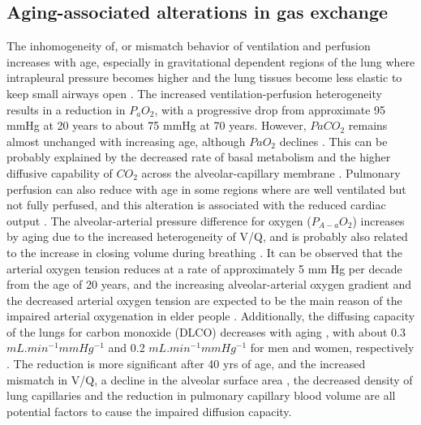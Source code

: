 \subsection{Aging-associated alterations in gas exchange}
The inhomogeneity of, or mismatch behavior of ventilation and perfusion increases with age, especially in gravitational dependent regions of the lung where intrapleural pressure becomes higher and the lung tissues become less elastic to keep small airways open \citep{holland1968regional, paoletti1985reference, lalley2013aging}. The increased ventilation-perfusion heterogeneity results in a reduction in $P_a O_2$, with a progressive drop from approximate 95 mmHg at 20 years to about 75 mmHg at 70 years. However, $Pa CO_2$ remains almost unchanged with increasing age, although $Pa O_2$ declines \citep{wahba1983influence, sprung2006age}. This can be probably explained by the decreased rate of basal metabolism and the higher diffusive capability of $CO_2$ across the alveolar-capillary membrane \citep{ levitzky1984effects}. Pulmonary perfusion can also reduce with age in some regions where are well ventilated but not fully perfused, and this alteration is associated with the reduced cardiac output \citep{levitzky1984effects,lalley2013aging}. The alveolar-arterial pressure difference for oxygen ($P_{A-a} O_2$) increases by aging due to the increased heterogeneity of V/Q, and is probably also related to the increase in closing volume during breathing \citep{janssens1999physiological}. It can be observed that the arterial oxygen tension reduces at a rate of approximately 5 mm Hg per decade from the age of 20 years, and the increasing alveolar-arterial oxygen gradient and the decreased arterial oxygen tension are expected to be the main reason of the impaired arterial oxygenation in elder people \citep{smith1986respiratory,zaugg2000respiratory}. Additionally, the diffusing capacity of the lungs for carbon monoxide (DLCO) decreases with aging \citep{guenard1996pulmonary}, with about 0.3 $mL.min^{-1}mmHg^{-1}$ and 0.2 $mL.min^{-1}mmHg^{-1}$ for men and women, respectively \citep{murray1986normal}. The reduction is more significant after 40 yrs of age, and the increased mismatch in V/Q, a decline in the alveolar surface area \citep{verbeken1992senile, thurlbeck1975growth}, the decreased density of lung capillaries \citep{butler1970capillary} and the reduction in pulmonary capillary blood volume \citep{guenard1996pulmonary} are all potential factors to cause the impaired diffusion capacity.

